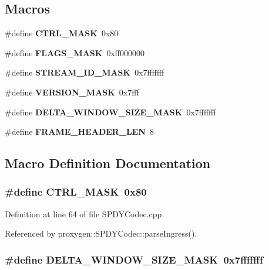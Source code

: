 \subsection*{Macros}
\begin{DoxyCompactItemize}
\item 
\#define {\bf C\+T\+R\+L\+\_\+\+M\+A\+SK}~0x80
\item 
\#define {\bf F\+L\+A\+G\+S\+\_\+\+M\+A\+SK}~0xff000000
\item 
\#define {\bf S\+T\+R\+E\+A\+M\+\_\+\+I\+D\+\_\+\+M\+A\+SK}~0x7fffffff
\item 
\#define {\bf V\+E\+R\+S\+I\+O\+N\+\_\+\+M\+A\+SK}~0x7fff
\item 
\#define {\bf D\+E\+L\+T\+A\+\_\+\+W\+I\+N\+D\+O\+W\+\_\+\+S\+I\+Z\+E\+\_\+\+M\+A\+SK}~0x7fffffff
\item 
\#define {\bf F\+R\+A\+M\+E\+\_\+\+H\+E\+A\+D\+E\+R\+\_\+\+L\+EN}~8
\end{DoxyCompactItemize}


\subsection{Macro Definition Documentation}
\subsubsection[{C\+T\+R\+L\+\_\+\+M\+A\+SK}]{\setlength{\rightskip}{0pt plus 5cm}\#define C\+T\+R\+L\+\_\+\+M\+A\+SK~0x80}\label{SPDYCodec_8cpp_a74914413f9f8256cbe1e79f5c3162c3b}


Definition at line 64 of file S\+P\+D\+Y\+Codec.\+cpp.



Referenced by proxygen\+::\+S\+P\+D\+Y\+Codec\+::parse\+Ingress().

\subsubsection[{D\+E\+L\+T\+A\+\_\+\+W\+I\+N\+D\+O\+W\+\_\+\+S\+I\+Z\+E\+\_\+\+M\+A\+SK}]{\setlength{\rightskip}{0pt plus 5cm}\#define D\+E\+L\+T\+A\+\_\+\+W\+I\+N\+D\+O\+W\+\_\+\+S\+I\+Z\+E\+\_\+\+M\+A\+SK~0x7fffffff}\label{SPDYCodec_8cpp_a2b932bc28e74bf513775bea4dcf1d7f3}


